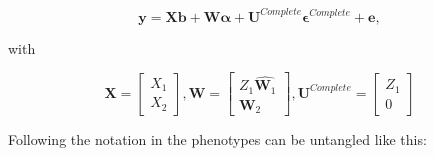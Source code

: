 \documentclass[12pt,titlepage]{article}
\begin{document}
\begin{equation} \label{eq:single-step-model}
\mathbf{y} = \mathbf{Xb} + \mathbf{W} \boldsymbol{\alpha} + \mathbf{U}^{Complete} \boldsymbol{\epsilon}^{Complete} + \mathbf{e},
\end{equation}

with

\begin{equation} \label{eq:single-step-submatrices}
\mathbf{X} = 
\begin{bmatrix}
  X_1 \\
  X_2 
 \end{bmatrix},
 \mathbf{W} = 
\begin{bmatrix}
  Z_1\hat{\mathbf{W}_1} \\
  \mathbf{W}_2 
 \end{bmatrix},
 \mathbf{U}^{Complete} = 
\begin{bmatrix}
  Z_1 \\
  0 
 \end{bmatrix}
\end{equation}

Following the notation in  the phenotypes can be untangled 
like this:
\end{document}

